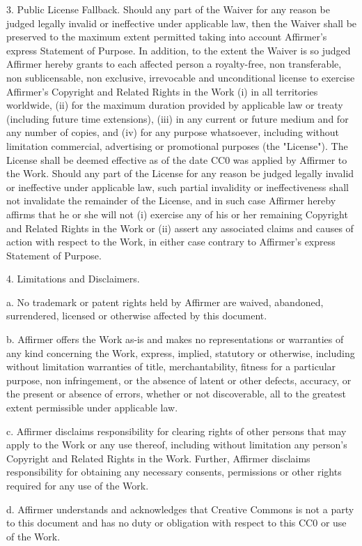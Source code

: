 \documentclass[a4paper,12pt]{article}
\begin{document}
\begin{appendices}
3. Public License Fallback. Should any part of the Waiver for any reason
be judged legally invalid or ineffective under applicable law, then the
Waiver shall be preserved to the maximum extent permitted taking into
account Affirmer's express Statement of Purpose. In addition, to the
extent the Waiver is so judged Affirmer hereby grants to each affected
person a royalty-free, non transferable, non sublicensable, non exclusive,
irrevocable and unconditional license to exercise Affirmer's Copyright and
Related Rights in the Work (i) in all territories worldwide, (ii) for the
maximum duration provided by applicable law or treaty (including future
time extensions), (iii) in any current or future medium and for any number
of copies, and (iv) for any purpose whatsoever, including without
limitation commercial, advertising or promotional purposes (the
"License"). The License shall be deemed effective as of the date CC0 was
applied by Affirmer to the Work. Should any part of the License for any
reason be judged legally invalid or ineffective under applicable law, such
partial invalidity or ineffectiveness shall not invalidate the remainder
of the License, and in such case Affirmer hereby affirms that he or she
will not (i) exercise any of his or her remaining Copyright and Related
Rights in the Work or (ii) assert any associated claims and causes of
action with respect to the Work, in either case contrary to Affirmer's
express Statement of Purpose.

4. Limitations and Disclaimers.

 a. No trademark or patent rights held by Affirmer are waived, abandoned,
    surrendered, licensed or otherwise affected by this document.
    
 b. Affirmer offers the Work as-is and makes no representations or
    warranties of any kind concerning the Work, express, implied,
    statutory or otherwise, including without limitation warranties of
    title, merchantability, fitness for a particular purpose, non
    infringement, or the absence of latent or other defects, accuracy, or
    the present or absence of errors, whether or not discoverable, all to
    the greatest extent permissible under applicable law.
    
 c. Affirmer disclaims responsibility for clearing rights of other persons
    that may apply to the Work or any use thereof, including without
    limitation any person's Copyright and Related Rights in the Work.
    Further, Affirmer disclaims responsibility for obtaining any necessary
    consents, permissions or other rights required for any use of the
    Work.
    
 d. Affirmer understands and acknowledges that Creative Commons is not a
    party to this document and has no duty or obligation with respect to
    this CC0 or use of the Work.
    
 
   
 \end{appendices}
\end{document}
